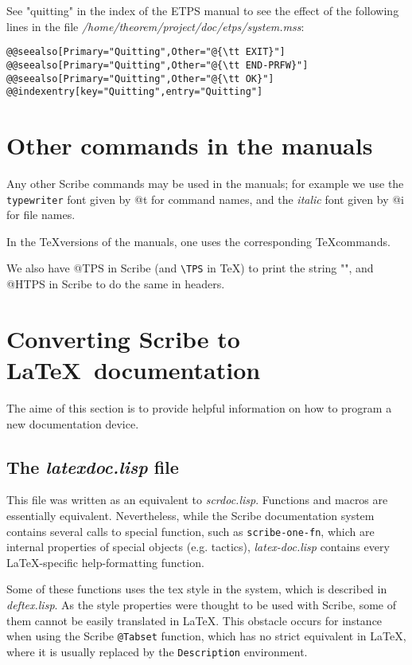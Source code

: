 See "quitting" in the index of the ETPS manual to see the 
effect of the following lines in the file
{\it /home/theorem/project/doc/etps/system.mss}:

\begin{verbatim}
@@seealso[Primary="Quitting",Other="@{\tt EXIT}"]
@@seealso[Primary="Quitting",Other="@{\tt END-PRFW}"]
@@seealso[Primary="Quitting",Other="@{\tt OK}"]
@@indexentry[key="Quitting",entry="Quitting"]
\end{verbatim}

\section{Other commands in the manuals}

Any other Scribe commands may be used in the manuals; for example
we use the {\tt typewriter} font given by @t for command 
names, and the {\it italic} font given by @i for file names.

In the \TeX versions of the manuals, one uses the corresponding
\TeX commands.

We also have @TPS in Scribe (and \verb+\TPS+ in \TeX)
to print the string "\TPS", and @HTPS in Scribe to do the
same in headers.

\section{Converting Scribe to \LaTeX ~documentation}

The aime of this section is to provide helpful information on how to
program a new documentation device.

\subsection{The {\it latexdoc.lisp} file}

This file was written as an equivalent to {\it scrdoc.lisp}. Functions and macros
are essentially equivalent. Nevertheless, while the Scribe documentation
system contains several calls to special function, such as {\tt scribe-one-fn}, which
are internal properties of special objects (e.g. tactics), {\it latex-doc.lisp} contains
every \LaTeX -specific help-formatting function.

Some of these functions uses the tex style in the \TPS system, which is described in
{\it deftex.lisp}. As the style properties were thought to be used with Scribe, some
of them cannot be easily translated in \LaTeX . This obstacle occurs for instance when
using the Scribe \verb+@Tabset+ function, which has no strict equivalent in \LaTeX , where it
is usually replaced by the \verb+Description+ environment.

